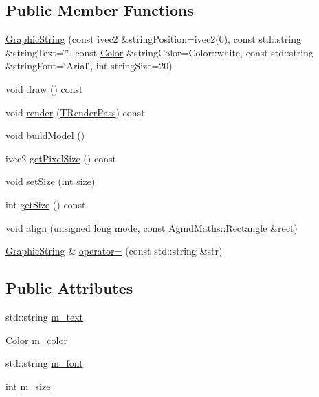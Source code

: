 \subsection*{Public Member Functions}
\begin{DoxyCompactItemize}
\item 
\hyperlink{class_agmd_1_1_graphic_string_a207dacb7edd1f65eaf283f16fc6f9873}{Graphic\+String} (const ivec2 \&string\+Position=ivec2(0), const std\+::string \&string\+Text=\char`\"{}\char`\"{}, const \hyperlink{class_agmd_utilities_1_1_color}{Color} \&string\+Color=Color\+::white, const std\+::string \&string\+Font=\char`\"{}Arial\char`\"{}, int string\+Size=20)
\item 
void \hyperlink{class_agmd_1_1_graphic_string_ab9d50266a34661bbf588d70b4b544ffa}{draw} () const 
\item 
void \hyperlink{class_agmd_1_1_graphic_string_a5dca6135a6e1b44a49ebe05e594bf1ed}{render} (\hyperlink{namespace_agmd_a893087981df53d0bf39466e9039aeb73}{T\+Render\+Pass}) const 
\item 
void \hyperlink{class_agmd_1_1_graphic_string_a49a622873a0db2884bf3559aa2d53018}{build\+Model} ()
\item 
ivec2 \hyperlink{class_agmd_1_1_graphic_string_aed7341e03f4993d89eb9684f03c910e3}{get\+Pixel\+Size} () const 
\item 
void \hyperlink{class_agmd_1_1_graphic_string_a0b5437cb0a60050e2238920bf73e6a06}{set\+Size} (int size)
\item 
int \hyperlink{class_agmd_1_1_graphic_string_a148a33e1076649d355619138a7fd2ac3}{get\+Size} () const 
\item 
void \hyperlink{class_agmd_1_1_graphic_string_af80769f95356e9efe0982171fc6fae55}{align} (unsigned long mode, const \hyperlink{class_agmd_maths_1_1_rectangle}{Agmd\+Maths\+::\+Rectangle} \&rect)
\item 
\hyperlink{class_agmd_1_1_graphic_string}{Graphic\+String} \& \hyperlink{class_agmd_1_1_graphic_string_aadc63a23f40a9a17a66a961a6d84e88e}{operator=} (const std\+::string \&str)
\end{DoxyCompactItemize}
\subsection*{Public Attributes}
\begin{DoxyCompactItemize}
\item 
std\+::string \hyperlink{class_agmd_1_1_graphic_string_aed2cd074b2c44f30386e9b611e0a8fad}{m\+\_\+text}
\item 
\hyperlink{class_agmd_utilities_1_1_color}{Color} \hyperlink{class_agmd_1_1_graphic_string_a71a19501502304fa5ed6727d8d07b1da}{m\+\_\+color}
\item 
std\+::string \hyperlink{class_agmd_1_1_graphic_string_a753dfe02c6197464de4b71f6cb8a0aa6}{m\+\_\+font}
\item 
int \hyperlink{class_agmd_1_1_graphic_string_a636e8c8552891a616c5ea59ad71349d4}{m\+\_\+size}
\end{DoxyCompactItemize}

